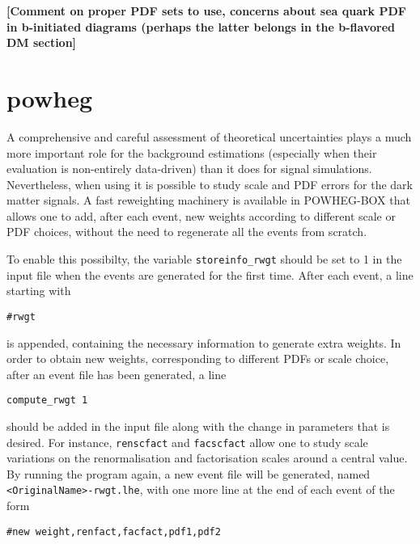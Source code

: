 

{\bf [Comment on proper PDF sets to use, concerns about sea quark PDF in b-initiated diagrams (perhaps the latter belongs in the b-flavored DM section]}

\section{powheg}

A comprehensive and careful assessment of theoretical uncertainties
plays a much more important role for the background estimations
(especially when their evaluation is non-entirely data-driven) than it
does for signal simulations. Nevertheless, when using \powheg it is
possible to study scale and PDF errors for the dark matter signals. A
fast reweighting machinery is available in {\sc POWHEG-BOX} that
allows one to add, after each event, new weights according to
different scale or PDF choices, without the need to regenerate all the
events from scratch. 

To enable this possibilty, the variable \texttt{storeinfo\_rwgt} should be set 
to 1 in the \powheg input file when the events are generated for the 
first time. After each event, a line starting with 

\begin{verbatim}
#rwgt 
\end{verbatim}

is appended, containing the necessary information to generate extra 
weights. In order to obtain new weights, corresponding to different 
PDFs or scale choice, after an event file has been generated, a line 

\begin{verbatim}
compute_rwgt 1 
\end{verbatim}
should be added in the input file along with the change in parameters
that is desired. For instance, \texttt{renscfact} and
\texttt{facscfact} allow one to study scale variations on the
renormalisation and factorisation scales around a central value. By
running the program again, a new event file will be generated, named
\texttt{<OriginalName>-rwgt.lhe}, with one more line at the end of each event of the form

\begin{verbatim}
#new weight,renfact,facfact,pdf1,pdf2 
\end{verbatim}

